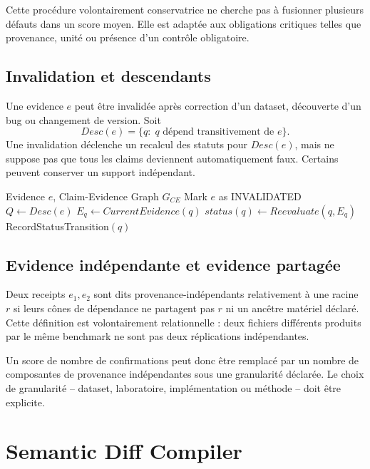 Cette procédure volontairement conservatrice ne cherche pas à fusionner plusieurs défauts dans un score moyen. Elle est adaptée aux obligations critiques telles que provenance, unité ou présence d'un contrôle obligatoire.

\section{Invalidation et descendants}

Une evidence $e$ peut être invalidée après correction d'un dataset, découverte d'un bug ou changement de version. Soit
\[
Desc(e)=\{q:\; q\text{ dépend transitivement de }e\}.
\]
Une invalidation déclenche un recalcul des statuts pour $Desc(e)$, mais ne suppose pas que tous les claims deviennent automatiquement faux. Certains peuvent conserver un support indépendant.

\begin{algorithm}
\caption{Propagation d'une invalidation}
\begin{algorithmic}[1]
\Require Evidence $e$, Claim-Evidence Graph $G_{CE}$
\State Mark $e$ as INVALIDATED
\State $Q\gets Desc(e)$
  \State $E_q\gets CurrentEvidence(q)$
  \State $status(q)\gets Reevaluate(q,E_q)$
  \State RecordStatusTransition$(q)$
\EndFor
\end{algorithmic}
\end{algorithm}

\section{Evidence indépendante et evidence partagée}

Deux receipts $e_1,e_2$ sont dits provenance-indépendants relativement à une racine $r$ si leurs cônes de dépendance ne partagent pas $r$ ni un ancêtre matériel déclaré. Cette définition est volontairement relationnelle : deux fichiers différents produits par le même benchmark ne sont pas deux réplications indépendantes.

Un score de nombre de confirmations peut donc être remplacé par un nombre de composantes de provenance indépendantes sous une granularité déclarée. Le choix de granularité -- dataset, laboratoire, implémentation ou méthode -- doit être explicite.

\chapter{Semantic Diff Compiler}

